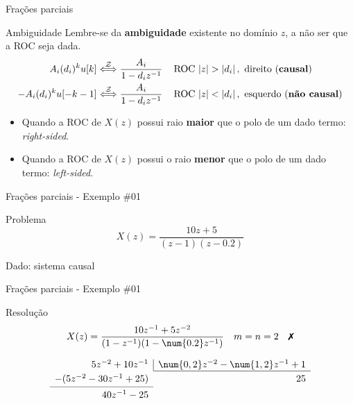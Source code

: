 \begin{frame}{Frações parciais}
\begin{block}{Ambiguidade}
	Lembre-se da \textbf{ambiguidade} existente no domínio $ z $, a não ser que a ROC seja dada.
	\begin{align*}
	A_i(d_i)^{k}u[k]&\overset{\mathcal{Z}}{\Longleftrightarrow}\dfrac{A_i}{1-d_iz^{-1}}& \, &\text{ROC }|z|>|d_i|\, ,\text{ direito (\textbf{causal})}\\
	-A_i(d_i)^{k}u[-k-1]&\overset{\mathcal{Z}}{\Longleftrightarrow}\dfrac{A_i}{1-d_iz^{-1}}& \, &\text{ROC }|z|<|d_i|\, ,\text{ esquerdo (\textbf{não causal})}
	\end{align*}
	
	\begin{itemize}
		\item Quando a ROC de $ X(z) $ possui raio \textbf{maior} que o polo de um dado termo: \textit{right-sided}.
		\item Quando a ROC de $ X(z) $ possui o raio \textbf{menor} que o polo de um dado termo: \textit{left-sided}.
	\end{itemize}
\end{block}
\end{frame}

\begin{frame}{Frações parciais - Exemplo \#01}
\begin{block}{Problema}
	\[ X(z)=\dfrac{10z+5}{
		\left(z-1\right)
		\left(z-\num{0.2}\right)} \]
		
	Dado: sistema causal
\end{block}
\end{frame}

\begin{frame}{Frações parciais - Exemplo \#01}
	\begin{block}{Resolução}
	    \[ X(z)=\dfrac{10z^{-1}+5z^{-2}}{(1-z^{-1})(1-\num{0.2}z^{-1})} \quad m=n=2\quad \text{\xmark} \]
	    
		\vspace{0.5cm}
		
		\[ \begin{array}{r r}
	5z^{-2}+10z^{-1} & \multicolumn{1}{|c}{\num{0,2}z^{-2}-\num{1,2}z^{-1}+1}\\\cline{2-2}
	-(5z^{-2}-30z^{-1}+25)	&25\rule{0pt}{2.6ex}\\
	\cmidrule{1-1}
	40z^{-1}-25
	\end{array} \]		
	
\end{block}
\end{frame}

